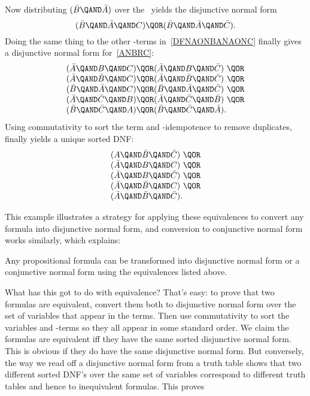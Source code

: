 Now distributing $(\bar{B} \QAND \bar{A})$ over the \QOR\ yields the
disjunctive normal form
\[
(\bar{B} \QAND \bar{A} \QAND C) \QOR
(\bar{B} \QAND \bar{A} \QAND \bar{C}).
\]
Doing the same thing to the other \QAND-terms in~\eqref{DFNAONBANAONC}
finally gives a disjunctive normal form for~\eqref{ANBRC}:
\[\begin{array}{l}
(\bar{A} \QAND B \QAND C) \QOR (\bar{A} \QAND B \QAND \bar{C})\ \QOR\\
(\bar{A} \QAND \bar{B} \QAND C) \QOR  (\bar{A} \QAND \bar{B} \QAND \bar{C})\ \QOR\\
(\bar{B} \QAND \bar{A} \QAND C) \QOR  (\bar{B} \QAND \bar{A} \QAND \bar{C})\ \QOR\\
(\bar{A} \QAND \bar{C} \QAND B) \QOR  (\bar{A} \QAND \bar{C} \QAND \bar{B})\ \QOR\\
(\bar{B} \QAND \bar{C} \QAND A) \QOR  (\bar{B} \QAND \bar{C} \QAND \bar{A}).
\end{array}\]
Using commutativity to sort the term and \QOR-idempotence to remove
duplicates, finally yields a unique sorted DNF:
\[\begin{array}{l}
(A \QAND \bar{B} \QAND \bar{C})\ \QOR\\
(\bar{A} \QAND B \QAND C)\ \QOR\\
(\bar{A} \QAND B \QAND \bar{C})\ \QOR\\
(\bar{A} \QAND \bar{B} \QAND C)\ \QOR\\
(\bar{A} \QAND \bar{B} \QAND \bar{C}).
\end{array}\]

This example illustrates a strategy for applying these equivalences to
convert any formula into disjunctive normal form, and conversion to
conjunctive normal form works similarly, which explains:
\begin{theorem}\label{completeDNF}
Any propositional formula can be transformed into disjunctive
  normal form%
 or a conjunctive normal form%
using the equivalences listed above.
\end{theorem}

What has this got to do with equivalence?  That's easy: to prove that
two formulas are equivalent, convert them both to disjunctive normal
form over the set of variables that appear in the terms.  Then use
commutativity to sort the variables and \QAND-terms so they all appear
in some standard order.  We claim the formulas are equivalent iff they
have the same sorted disjunctive normal form.  This is obvious if they
do have the same disjunctive normal form.  But conversely, the way we
read off a disjunctive normal form from a truth table shows that two
different sorted DNF's over the same set of variables correspond to
different truth tables and hence to inequivalent formulas.  This
proves


